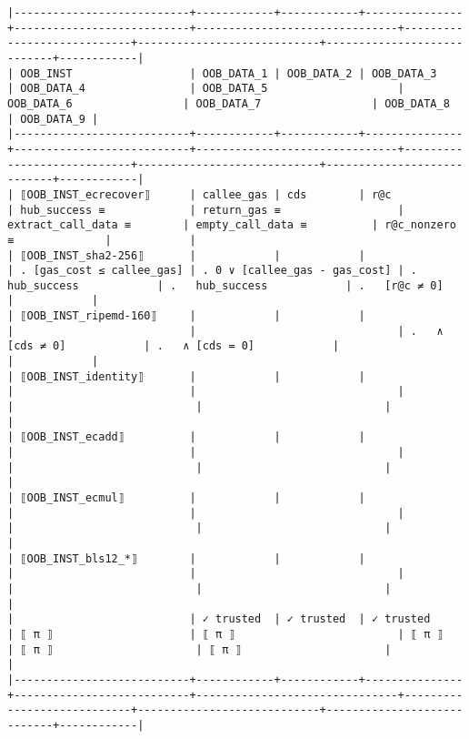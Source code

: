 \documentclass[varwidth=\maxdimen,margin=0.5cm,multi={verbatim}]{standalone}
\begin{document}
\begin{verbatim}
|---------------------------+------------+------------+---------------+---------------------------+-------------------------------+----------------------------+----------------------------+----------------------------+------------|
| OOB_INST                  | OOB_DATA_1 | OOB_DATA_2 | OOB_DATA_3    | OOB_DATA_4                | OOB_DATA_5                    | OOB_DATA_6                 | OOB_DATA_7                 | OOB_DATA_8                 | OOB_DATA_9 |
|---------------------------+------------+------------+---------------+---------------------------+-------------------------------+----------------------------+----------------------------+----------------------------+------------|
| ⟦OOB_INST_ecrecover⟧      | callee_gas | cds        | r@c           | hub_success ≡             | return_gas ≡                  | extract_call_data ≡        | empty_call_data ≡          | r@c_nonzero ≡              |            |
| ⟦OOB_INST_sha2-256⟧       |            |            |               | . [gas_cost ≤ callee_gas] | . 0 ∨ [callee_gas - gas_cost] | .   hub_success            | .   hub_success            | .   [r@c ≠ 0]              |            |
| ⟦OOB_INST_ripemd-160⟧     |            |            |               |                           |                               | .   ∧ [cds ≠ 0]            | .   ∧ [cds = 0]            |                            |            |
| ⟦OOB_INST_identity⟧       |            |            |               |                           |                               |                            |                            |                            |            |
| ⟦OOB_INST_ecadd⟧          |            |            |               |                           |                               |                            |                            |                            |            |
| ⟦OOB_INST_ecmul⟧          |            |            |               |                           |                               |                            |                            |                            |            |
| ⟦OOB_INST_bls12_*⟧        |            |            |               |                           |                               |                            |                            |                            |            |
|                           | ✓ trusted  | ✓ trusted  | ✓ trusted     | ⟦ π ⟧                     | ⟦ π ⟧                         | ⟦ π ⟧                      | ⟦ π ⟧                      | ⟦ π ⟧                      |            |
|---------------------------+------------+------------+---------------+---------------------------+-------------------------------+----------------------------+----------------------------+----------------------------+------------|

\end{verbatim}
\end{document}
